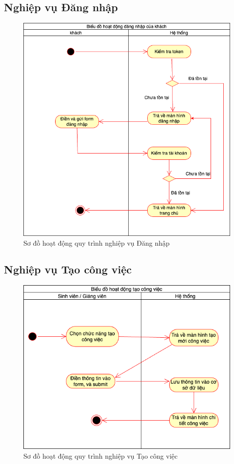 \documentclass[../Main.tex]{subfiles}
\begin{document}
\subsection{Nghiệp vụ Đăng nhập}
\begin{figure}[H]
   \centering
    \includegraphics[width=0.85\linewidth]{Figure/dang_nhap.png}
    \caption{Sơ đồ hoạt động quy trình nghiệp vụ Đăng nhập}
    \label{fig:dang_nhap}
\end{figure}
\newpage
\subsection{Nghiệp vụ Tạo công việc}

\begin{figure}[H]
   \centering
    \includegraphics[width=0.85\linewidth]{Figure/qt_new_task.png}
    \caption{Sơ đồ hoạt động quy trình nghiệp vụ Tạo công việc}
    \label{fig:qt_new_task}
\end{figure}
\end{document}
